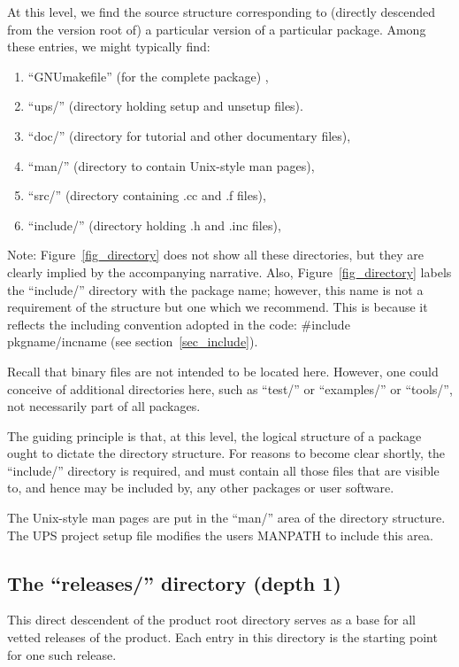    At this level, we find the source structure corresponding to (directly 
descended from the version root of) a particular version of a particular 
package. Among these entries, we might typically find: 
\begin{enumerate}
\item ``GNUmakefile'' (for the complete package) , 
\item  ``ups/'' (directory holding setup and unsetup files).
\item ``doc/'' (directory for tutorial and other documentary files), 
\item ``man/'' (directory to contain Unix-style man pages), 
\item ``src/'' (directory containing .cc and .f files), 
\item ``include/'' (directory holding .h and .inc files), 
\end{enumerate}

    Note: Figure~\ref{fig_directory} does not show all these directories, but 
they are clearly implied by the accompanying narrative. Also, 
Figure~\ref{fig_directory} labels the ``include/'' directory with the 
package name; however, this name is not a requirement of the structure but one which we 
recommend. This is because it reflects the including convention adopted in
the code: \#include pkgname/incname (see section~\ref{sec_include}).  

Recall that binary files are not intended to be located here.
However, one could conceive of additional directories here, such as ``test/'' or 
``examples/'' or ``tools/'', not necessarily part of all packages.

    The guiding principle is that, at this level, the logical structure of a 
package ought to dictate the directory structure. For reasons to become clear 
shortly, the ``include/'' directory is required, and must contain all those 
files that are visible to, and hence may be included by, any other packages or 
user software. 

The Unix-style man pages are put in the ``man/'' area of the directory 
structure. The UPS project setup file modifies the users MANPATH to include 
this area.

\subsection{The ``releases/'' directory (depth 1)}

    This direct descendent of the product root directory serves as a base for 
all vetted releases of the product. Each entry in this directory is the 
starting point for one such release. 

